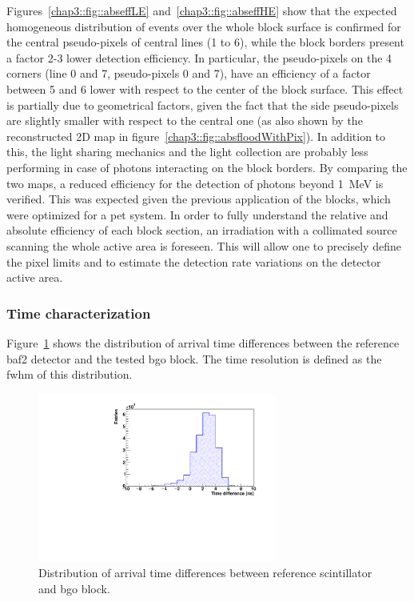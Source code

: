 Figures~\ref{chap3::fig::abseffLE} and~\ref{chap3::fig::abseffHE} show that the expected homogeneous distribution of events over the whole block surface is confirmed for the central pseudo-pixels of central lines (1 to 6), while the block borders present a factor 2-3 lower detection efficiency. In particular, the pseudo-pixels on the 4 corners (line 0 and 7, pseudo-pixels 0 and 7), have an efficiency of a factor between 5 and 6 lower with respect to the center of the block surface. This effect is partially due to geometrical factors, given the fact that the side pseudo-pixels are slightly smaller with respect to the central one (as also shown by the reconstructed 2D map in figure~\ref{chap3::fig::absfloodWithPix}). In addition to this, the light sharing mechanics and the light collection are probably less performing in case of photons interacting on the block borders. By comparing the two maps, a reduced efficiency for the detection of photons beyond 1~MeV is verified. This was expected given the previous application of the blocks, which were optimized for a \gls{pet} system. In order to fully understand the relative and absolute efficiency of each block section, an irradiation with a collimated source scanning the whole active area is foreseen. This will allow one to precisely define the pixel limits and to estimate the detection rate variations on the detector active area.

\subsubsection{Time characterization}\label{chap3::subsubsec::timeChar}

Figure~\ref{chap3::fig::abstimeDiff} shows the distribution of arrival time differences between the reference \gls{baf2} detector and the tested \gls{bgo} block. The time resolution is defined as the \gls{fwhm} of this distribution.

\begin{figure}
 \centering
  \includegraphics[width=0.7\textwidth]{03_GraphicFiles/chapter3_CLaRySproto/Absorber/images/timeDiff_distr.pdf}
  \caption{Distribution of arrival time differences between reference scintillator and \gls{bgo} block.}	
  \label{chap3::fig::abstimeDiff}
\end{figure}

